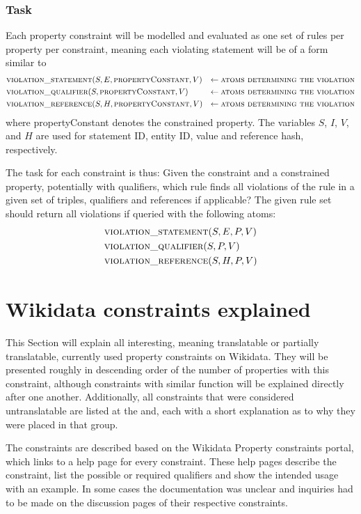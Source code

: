 \documentclass[hyperref,bachelorofscience,fleqn]{cgvpub}
\begin{document}
\subsection{Task}\label{subsec_task}
Each property constraint will be modelled and evaluated as one set of rules per property per constraint, meaning each violating statement will be of a form similar to
\begin{align*}
&\textsc{violation\_statement}(S, E, \textsc{propertyConstant}, V) &\leftarrow \textsc{atoms determining the violation} \\
&\textsc{violation\_qualifier}(S, \textsc{propertyConstant}, V) &\leftarrow \textsc{atoms determining the violation} \\
&\textsc{violation\_reference}(S, H, \textsc{propertyConstant}, V) &\leftarrow \textsc{atoms determining the violation}
\end{align*}
where propertyConstant denotes the constrained property. The variables \(S\), \(I\), \(V\), and \(H\) are used for statement ID, entity ID, value and reference hash, respectively.

The task for each constraint is thus: Given the constraint and a constrained property, potentially with qualifiers, which rule finds all violations of the rule in a given set of triples, qualifiers and references if applicable? The given rule set should return all violations if queried with the following atoms:
\begin{align*}
&\textsc{violation\_statement}(S, E, P, V) \\
&\textsc{violation\_qualifier}(S, P, V) \\
&\textsc{violation\_reference}(S, H, P, V)
\end{align*}

\chapter{Wikidata constraints explained}\label{cha_wikidata_constraints_explained}
This Section will explain all interesting, meaning translatable or partially translatable, currently used property constraints on Wikidata. They will be presented roughly in descending order of the number of properties with this constraint, although constraints with similar function will be explained directly after one another. Additionally, all constraints that were considered untranslatable are listed at the and, each with a short explanation as to why they were placed in that group.

The constraints are described based on the Wikidata Property constraints portal\cite{constraintsPortal}, which links to a help page for every constraint. These help pages describe the constraint, list the possible or required qualifiers and show the intended usage with an example. In some cases the documentation was unclear and inquiries had to be made on the discussion pages of their respective constraints.
\end{document}
